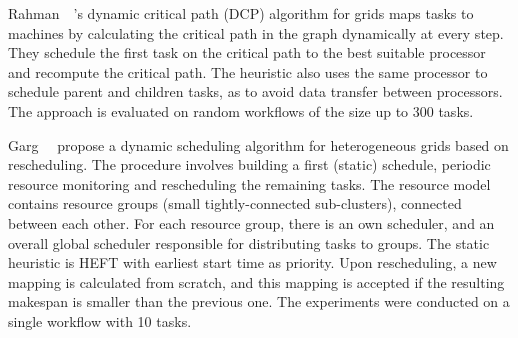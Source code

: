 \documentclass[conference]{IEEEtran}
\begin{document}
    Rahman~\etal~\cite{rahman2013}'s dynamic critical path (DCP) algorithm for grids maps tasks to machines
    by calculating the critical path in the graph dynamically at every step.
    They schedule the first task on the critical path to the best suitable processor and recompute the critical path.
    The heuristic also uses the same processor to schedule parent and children tasks, as to avoid data transfer between processors.
    The approach is evaluated on random workflows of the size up to 300 tasks.


    Garg~\etal~\cite{GARG2015256} propose a dynamic scheduling algorithm for heterogeneous grids based on rescheduling.
    The procedure involves building a first (static) schedule, periodic resource monitoring and rescheduling the remaining
    tasks.
    The resource model contains resource groups (small tightly-connected sub-clusters), connected between each other.
    For each resource group, there is an own scheduler, and an overall global scheduler responsible for distributing
    tasks to groups.
    The static heuristic is HEFT with earliest start time as priority.
    Upon rescheduling, a new mapping is calculated from scratch, and this mapping is accepted if the resulting makespan
    is smaller than the previous one.
    The experiments were conducted on a single workflow with 10 tasks.
%

\end{document}
